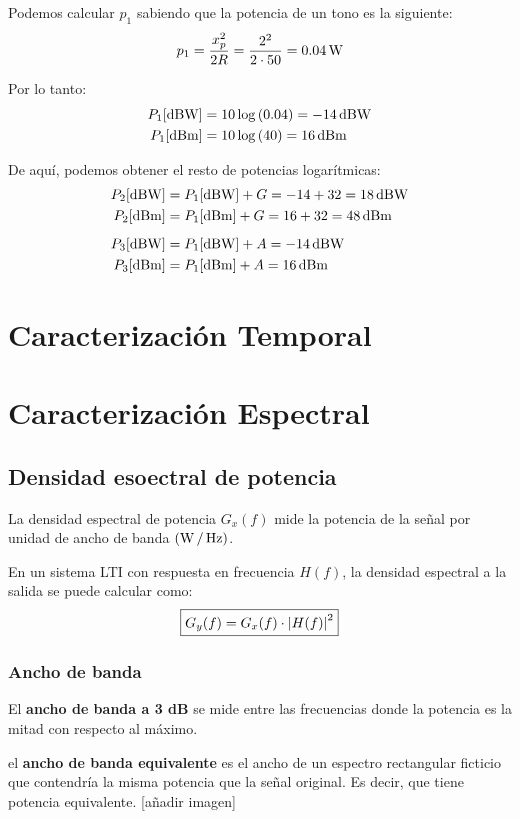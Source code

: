 \documentclass[a4paper]{book}
\begin{document}
Podemos calcular $p_1$ sabiendo que la potencia de un tono es la siguiente:
\[ p_1 = \frac{x_p^2}{2R} = \frac{2^2}{2 \cdot 50} = 0.04\operatorname{W} \]

Por lo tanto:
\begin{align*}
	P_1 [\operatorname{dBW}] &= 10 \log \left( 0.04 \right) = -14\operatorname{dBW} \\ 
	P_1 [\operatorname{dBm}] &= 10 \log \left( 40 \right) = 16\operatorname{dBm}
\end{align*}

De aquí, podemos obtener el resto de potencias logarítmicas:
\begin{align*}
	P_2 [\operatorname{dBW}] &= P_1[\operatorname{dBW}] + G = -14 + 32 = 18\operatorname{dBW} \\ 
	P_2 [\operatorname{dBm}] &= P_1[\operatorname{dBm}] + G = 16 + 32 = 48\operatorname{dBm}\\[5pt]
	P_3 [\operatorname{dBW}] &= P_1[\operatorname{dBW}] + A  = -14\operatorname{dBW} \\ 
	P_3 [\operatorname{dBm}] &= P_1[\operatorname{dBm}] + A  = 16\operatorname{dBm}
\end{align*}


\section{Caracterización Temporal}
\section{Caracterización Espectral}

\subsection{Densidad esoectral de potencia}

La densidad espectral de potencia $G_x(f)$ mide la potencia de la señal por unidad de ancho de banda $\left( \operatorname{W} / \operatorname{Hz} \right)$.

En un sistema LTI con respuesta en frecuencia $H(f)$, la densidad espectral a la salida se puede calcular como:
\[ \boxed{G_y(f) = G_x(f) \cdot \abs{H(f)}^2} \]

\subsubsection{Ancho de banda}

El \textbf{ancho de banda a 3 dB} se mide entre las frecuencias donde la potencia es la mitad con respecto al máximo.

el \textbf{ancho de banda equivalente} es el ancho de un espectro rectangular ficticio que contendría la misma potencia que la señal original. Es decir, que tiene potencia equivalente. [añadir imagen]
\end{document}
